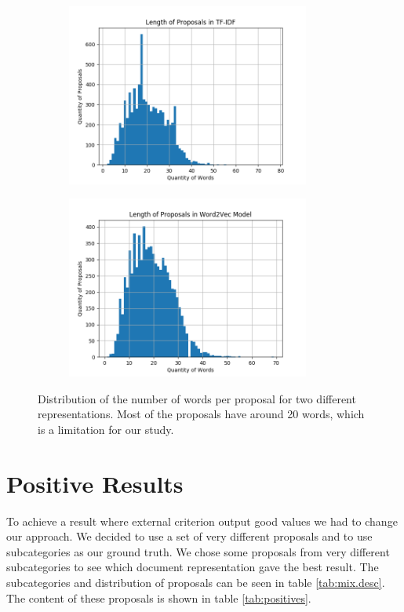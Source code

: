 \begin{figure}[!htpb]
\begin{subfigure}{.5\textwidth}
  \centering
  \includegraphics[width=8cm]{Figures/tfidf_words.png}
  \caption{}
  \label{fig:sub2}
\end{subfigure}
  \begin{subfigure}{.5\textwidth}
  \centering
  \includegraphics[width=8cm]{Figures/tfidf_word2vec_words.png}
  \caption{}
  \label{fig:sub3}
\end{subfigure}
\caption{Distribution of the number of words per proposal for two different representations. Most of the proposals have around 20 words, which is a limitation for our study.}
\label{fig:qty.words}
\end{figure}

\FloatBarrier
\section{Positive Results}
To achieve a result where external criterion output good values we had to change our approach. We decided to use a set of very different proposals and to use subcategories as our ground truth. We chose some proposals from very different subcategories to see which document representation gave the best result. The subcategories and distribution of proposals can be seen in table \ref{tab:mix.desc}. The content of these proposals is shown in table \ref{tab:positives}.

